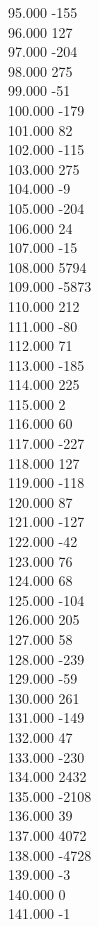 { 95.000	-155 \\
 96.000	127 \\
 97.000	-204 \\
 98.000	275 \\
 99.000	-51 \\
 100.000	-179 \\
 101.000	82 \\
 102.000	-115 \\
 103.000	275 \\
 104.000	-9 \\
 105.000	-204 \\
 106.000	24 \\
 107.000	-15 \\
 108.000	5794 \\
 109.000	-5873 \\
 110.000	212 \\
 111.000	-80 \\
 112.000	71 \\
 113.000	-185 \\
 114.000	225 \\
 115.000	2 \\
 116.000	60 \\
 117.000	-227 \\
 118.000	127 \\
 119.000	-118 \\
 120.000	87 \\
 121.000	-127 \\
 122.000	-42 \\
 123.000	76 \\
 124.000	68 \\
 125.000	-104 \\
 126.000	205 \\
 127.000	58 \\
 128.000	-239 \\
 129.000	-59 \\
 130.000	261 \\
 131.000	-149 \\
 132.000	47 \\
 133.000	-230 \\
 134.000	2432 \\
 135.000	-2108 \\
 136.000	39 \\
 137.000	4072 \\
 138.000	-4728 \\
 139.000	-3 \\
 140.000	0 \\
 141.000	-1 \\
}
